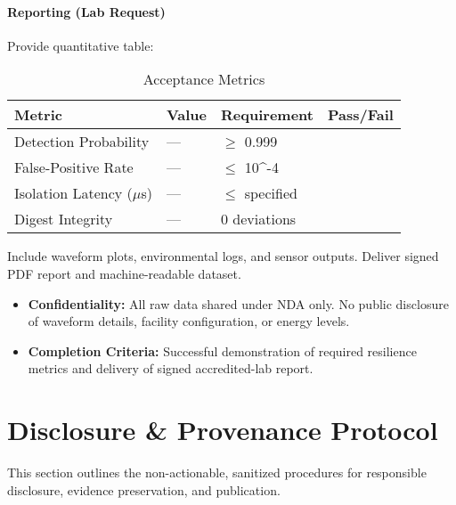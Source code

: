 \documentclass[11pt, a4paper]{article}
\begin{document}
\subsection{Reporting (Lab Request)}
Provide quantitative table:
\begin{table}[h]
\centering
\caption{Acceptance Metrics}
\begin{tabular}{@{}llll@{}}
\toprule
\textbf{Metric} & \textbf{Value} & \textbf{Requirement} & \textbf{Pass/Fail} \\ \midrule
Detection Probability & --- & $\ge$ 0.999 & \\
False-Positive Rate & --- & $\le$ 10^{-4} & \\
Isolation Latency ($\mu$s) & --- & $\le$ specified & \\
Digest Integrity & --- & 0 deviations & \\\bottomrule
\end{tabular}
\end{table}

Include waveform plots, environmental logs, and sensor outputs. Deliver signed PDF report and machine-readable dataset.
\begin{itemize}
    \item \textbf{Confidentiality:} All raw data shared under NDA only. No public disclosure of waveform details, facility configuration, or energy levels.
    \item \textbf{Completion Criteria:} Successful demonstration of required resilience metrics and delivery of signed accredited-lab report.
\end{itemize}

\newpage
\part{Disclosure \& Provenance Protocol}
\label{part:disclosure_protocol}
This section outlines the non-actionable, sanitized procedures for responsible disclosure, evidence preservation, and publication.
\end{document}
